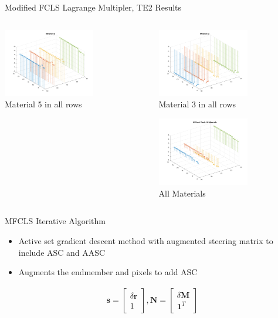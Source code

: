 \documentclass{beamer}
\begin{document}
\begin{frame}{Modified FCLS Lagrange Multipler, TE2 Results}
\begin{columns}
\begin{column}{0.33\textwidth}
        \includegraphics[width=4cm,center]{mfcls2_te2_material_stem_5}
        \\ Material 5 in all rows
        \centering
    \end{column}
    \begin{column}{0.33\textwidth}
        \includegraphics[width=4cm,center]{mfcls2_te2_material_stem_3}
        \\ Material 3 in all rows
        \centering

        \includegraphics[width=4cm,center]{mfcls2_te2_allmaterials}
        \\ All Materials
        \centering
    \end{column}
\end{columns}
\end{frame}

\begin{frame}{MFCLS Iterative Algorithm}
\begin{itemize}
\item Active set gradient descent method with augmented steering matrix to include ASC and AASC
\item Augments the endmember and pixels to add ASC
\end{itemize}

\begin{align*}
\mathbf{s} = \begin{bmatrix}
\delta\mathbf{r} \\ 1
\end{bmatrix},
\mathbf{N} = \begin{bmatrix}
\delta \mathbf{M} \\ \mathbf{1}^T
\end{bmatrix}
\end{align*}
\end{frame}
\end{document}
